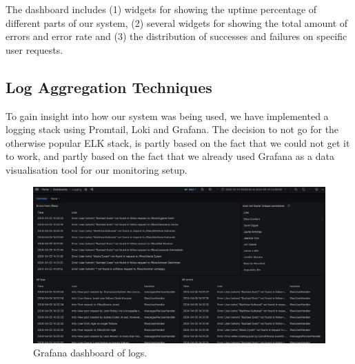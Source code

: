 The dashboard includes (1) widgets for showing the uptime percentage of different parts of our system, (2) several widgets for showing the total amount of errors and error rate and (3) the distribution of successes and failures on specific user requests.






\subsection{Log Aggregation Techniques}
To gain insight into how our system was being used, we have implemented a logging stack using Promtail, Loki and Grafana. 
The decision to not go for the otherwise popular ELK stack, is partly based on the fact that we could not get it to work, and partly based on the fact that we already used Grafana as a data visualisation tool for our monitoring setup.

\begin{figure}[h]
    \centering
    \includegraphics[width=\textwidth]{images/logging.png}
    \caption{Grafana dashboard of logs.}
    \label{fig:logging}
\end{figure}

